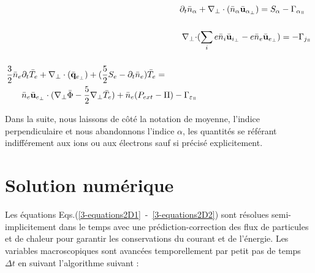 \begin{refsection}
\begin{align}
\label{3-equations2D1}
\partial_t \bar{n}_\alpha& +
\nabla_\perp\cdot\left(\bar{n}_\alpha\bar{\mathbf{u}}_{\alpha_\perp}\right)=S_\alpha
- \Gamma_{\alpha_\para}\\[0.5cm]
\nabla_\perp\cdot&(\sum_ie\bar{n}_i\bar{\mathbf{u}}_{i_\perp}
-e\bar{n}_e\bar{\mathbf{u}}_{e_\perp})= - \Gamma_{j_\para}\\[0.5cm]
\begin{split}\frac{3}{2}\bar{n}_e&\partial_t\bar{T}_e +
\nabla_\perp\cdot(\bar{\mathbf{q}}_{e_\perp}) +
(\frac{5}{2}S_e-\partial_t\bar{n}_e)\bar{T}_e =\\
&\bar{n}_e\bar{\mathbf{u}}_{e_\perp}\cdot(\nabla_\perp
\bar{\Phi}-\frac{5}{2}\nabla_\perp
\bar{T}_e)+\bar{n}_e(P_{ext}-\Pi)-\Gamma_{\varepsilon_\para}
\label{3-equations2D2}
\end{split}
\end{align}

Dans la suite, nous laissons de côté la notation de moyenne, l'indice
perpendiculaire et nous abandonnons l'indice $\alpha$, les quantités se référant
indifférement aux ions ou aux électrons sauf si précisé explicitement.

\section{Solution numérique}

Les équations Eqs.(\ref{3-equations2D1}~-~\ref{3-equations2D2}) sont résolues
semi-implicitement dans le temps avec une prédiction-correction des flux de
particules et de chaleur pour garantir les conservations du courant et de
l'énergie. Les variables macroscopiques sont avancées temporellement par
petit pas de temps $\Delta t$ en suivant l'algorithme suivant :


\end{refsection}
